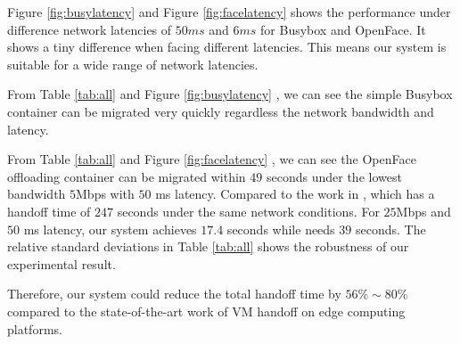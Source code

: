 
Figure \ref{fig:busylatency}
and
Figure \ref{fig:facelatency} shows the performance under difference network latencies of $50ms$ and $6ms$ for Busybox and OpenFace.  It shows a tiny difference when facing different latencies. This means our system is suitable for a wide range of network latencies.


From Table \ref{tab:all} and Figure \ref{fig:busylatency} , we can see the simple Busybox container can be migrated very quickly regardless the network bandwidth and latency. 

From Table \ref{tab:all} and Figure \ref{fig:facelatency} , we can see the OpenFace offloading container can be migrated within $49$ seconds under the lowest bandwidth $5$Mbps with $50$ ms latency. Compared to the work in \cite{ha2015vmhandoff}, which has a handoff time of $247$ seconds under the same network conditions. For $25$Mbps and $50$ ms latency, our system achieves $17.4$ seconds while  \cite{ha2015vmhandoff}  needs $39$ seconds. The relative standard deviations in Table \ref{tab:all} shows the robustness of our experimental result.


Therefore, our system could reduce the total handoff time by $56\%\sim 80\%$ compared to the state-of-the-art work of VM handoff \cite{ha2015vmhandoff} on edge computing platforms. 














